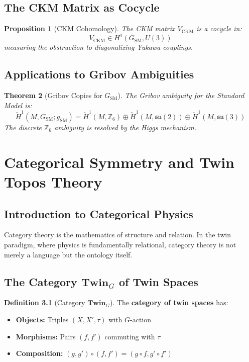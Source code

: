 \documentclass[11pt,a4paper,openright]{book}
\theoremstyle{plain}
\newtheorem{theorem}{Theorem}[chapter]
\newtheorem{proposition}[theorem]{Proposition}
\theoremstyle{definition}
\newtheorem{definition}[theorem]{Definition}
\newcommand{\SM}{\mathrm{SM}}
\newcommand{\Z}{\mathbb{Z}}
\newcommand{\Twin}{\mathbf{Twin}}
\begin{document}
\section{The CKM Matrix as Cocycle}

\begin{proposition}[CKM Cohomology]
The CKM matrix $V_{\mathrm{CKM}}$ is a cocycle in:
\begin{equation}
V_{\mathrm{CKM}} \in H^1(G_{\SM}, U(3))
\end{equation}
measuring the obstruction to diagonalizing Yukawa couplings.
\end{proposition}

\section{Applications to Gribov Ambiguities}

\begin{theorem}[Gribov Copies for $G_{\SM}$]
The Gribov ambiguity for the Standard Model is:
\begin{equation}
\check{H}^1(M, G_{\SM}; g_{\SM}) = \check{H}^1(M, \Z_6) \oplus \check{H}^1(M, \mathfrak{su}(2)) \oplus \check{H}^1(M, \mathfrak{su}(3))
\end{equation}
The discrete $\Z_6$ ambiguity is resolved by the Higgs mechanism.
\end{theorem}

\chapter{Categorical Symmetry and Twin Topos Theory}
\label{ch:category}

\section{Introduction to Categorical Physics}

Category theory is the mathematics of structure and relation. In the twin paradigm, where physics is fundamentally relational, category theory is not merely a language but the ontology itself.

\section{The Category $\Twin_G$ of Twin Spaces}

\begin{definition}[Category $\Twin_G$]
The \textbf{category of twin spaces} has:
\begin{itemize}
    \item \textbf{Objects:} Triples $(X, X', \tau)$ with $G$-action
    \item \textbf{Morphisms:} Pairs $(f, f')$ commuting with $\tau$
    \item \textbf{Composition:} $(g,g') \circ (f,f') = (g \circ f, g' \circ f')$
\end{itemize}
\end{definition}
\end{document}
